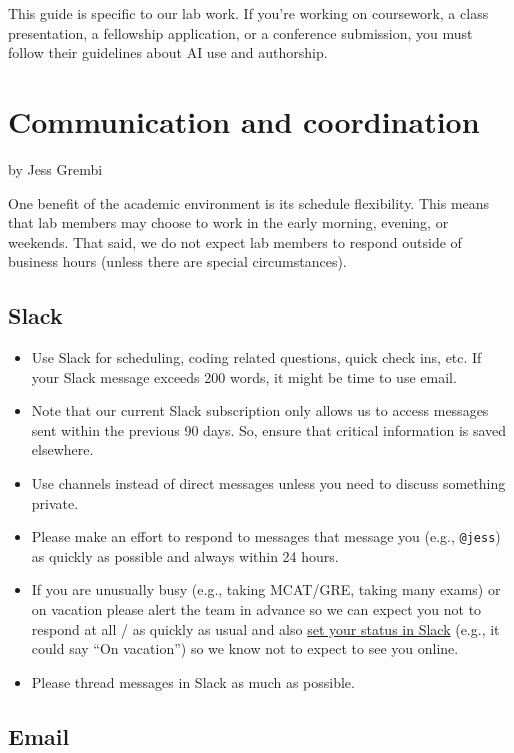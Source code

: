 \documentclass[
]{book}
\providecommand{\tightlist}{%
  \setlength{\itemsep}{0pt}\setlength{\parskip}{0pt}}
\begin{document}
This guide is specific to our lab work. If you're working on coursework, a class presentation, a fellowship application, or a conference submission, you must follow their guidelines about AI use and authorship.

\chapter{Communication and coordination}\label{communication-and-coordination}

by Jess Grembi

One benefit of the academic environment is its schedule flexibility. This means that lab members may choose to work in the early morning, evening, or weekends. That said, we do not expect lab members to respond outside of business hours (unless there are special circumstances).

\section{Slack}\label{slack}

\begin{itemize}
\tightlist
\item
  Use Slack for scheduling, coding related questions, quick check ins, etc. If your Slack message exceeds 200 words, it might be time to use email.
\item
  Note that our current Slack subscription only allows us to access messages sent within the previous 90 days. So, ensure that critical information is saved elsewhere.
\item
  Use channels instead of direct messages unless you need to discuss something private.
\item
  Please make an effort to respond to messages that message you (e.g., \texttt{@jess}) as quickly as possible and always within 24 hours.
\item
  If you are unusually busy (e.g., taking MCAT/GRE, taking many exams) or on vacation please alert the team in advance so we can expect you not to respond at all / as quickly as usual and also \href{https://get.slack.help/hc/en-us/articles/201864558-Set-your-Slack-status-and-availability}{set your status in Slack} (e.g., it could say ``On vacation'') so we know not to expect to see you online.
\item
  Please thread messages in Slack as much as possible.
\end{itemize}

\section{Email}\label{email}
\end{document}
